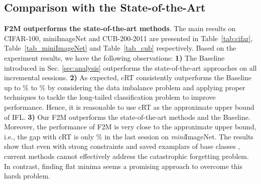 \documentclass{article}
\begin{document}
\subsection{Comparison with the State-of-the-Art}
\textbf{F2M outperforms the state-of-the-art methods}. The main results on CIFAR-100, miniImageNet and CUB-200-2011 are presented in Table~\ref{tab:cifar}, Table~\ref{tab_miniImageNet} and Table~\ref{tab_cub} respectively. Based on the experiment results, we have the following observations: \textbf{1)} The Baseline introduced in Sec. \ref{sec:analysis} outperforms the state-of-the-art approaches on all incremental sessions. \textbf{2)} As expected, cRT consistently outperforms the Baseline up to \% to \% by considering the data imbalance problem and applying proper techniques to tackle the long-tailed classification problem to improve performance. Hence, it is reasonable to use cRT as the approximate upper bound of IFL. \textbf{3)} Our F2M outperforms the state-of-the-art methods and the Baseline. Moreover, the performance of F2M is very close to the approximate upper bound, i.e., the gap with cRT is only \% in the last session on \emph{mini}ImageNet.
The results show that even with strong constraints  \cite{NCM,icarl,FSLL} and saved examplars of base classes \cite{NCM,icarl,IDLVQC}, current methods cannot effectively address the catastrophic forgetting problem. In contrast, finding flat minima seems a promising approach to overcome this harsh problem.
\end{document}
